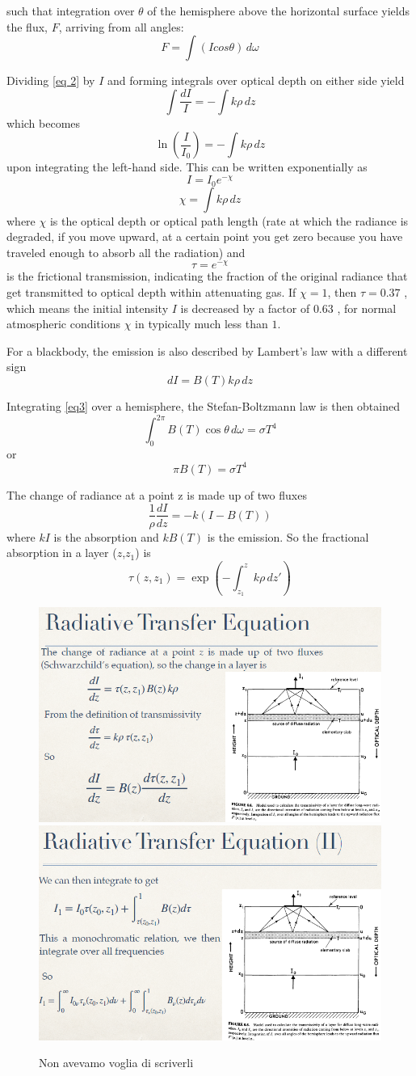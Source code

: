 such that integration over $\theta$ of the hemisphere above the horizontal surface yields the flux, $F$, arriving from all angles:
\begin{equation}
	F=\int(Icos\theta )\,d\omega
	\label{eq 2}
\end{equation}

Dividing \ref{eq 2} by $I$ and forming integrals over optical depth on either side yield
\[\int \frac{dI}{I} = - \int k \rho \, dz\]
which becomes
\[\ln \left( \frac{I}{I_0} \right) = - \int k \rho \, dz\]
upon integrating the left-hand side.
This can be written exponentially as
\[I = I_0 e^{-\chi}\]
\[\chi=\int k \rho \,dz \]
where $\chi$ is the optical depth or optical path length (rate at which the radiance is degraded, if you move upward, at a certain point you get zero because you have traveled enough to absorb all the radiation)  and
\[\tau = e^{-\chi}\]
is the frictional transmission, indicating the fraction of the original radiance that get transmitted to optical depth within attenuating gas. If $\chi=1$, then $\tau=0.37$ , which means the initial intensity $I$ is decreased by a factor of $0.63$ , for normal atmospheric conditions $\chi$ in typically much less than $1$.

For a blackbody, the emission is also described by Lambert's law with a different sign
\begin{equation}
	dI = B(T) k \rho \, dz
	\label{eq3}
\end{equation}

Integrating \ref{eq3} over a hemisphere, the Stefan-Boltzmann law is then obtained
\[\int_0^{2\pi} B(T) \cos \theta \, d\omega = \sigma T^4\]
or \[\pi B(T) = \sigma T^4\]

The change of radiance at a point z is made up of two fluxes
\[\frac{1}{\rho} \frac{dI}{dz} = -k (I - B(T))\] where $kI$ is the absorption and $kB(T)$ is the emission.
So the fractional absorption in a layer ($z$,$z_1$) is $$\tau(z, z_1) = \exp \left( - \int_{z_1}^z k \rho \, dz' \right)$$
\begin{figure}[htbp]
	\centering
	\includegraphics[width=0.35\linewidth]{uploads/16image.png}\quad\includegraphics[width=0.35\linewidth]{uploads/17image.png}
	\caption{Non avevamo voglia di scriverli}
	\label{fig:enter-label}
\end{figure}




